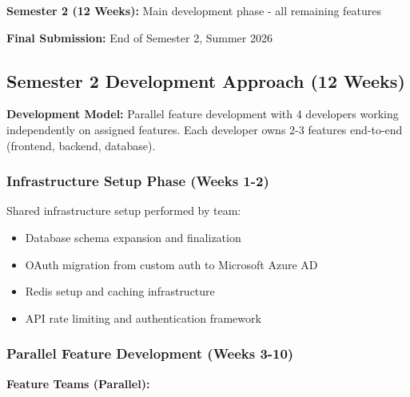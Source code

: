 \documentclass[12pt,a4paper]{article}
\begin{document}
\textbf{Semester 2 (12 Weeks):} Main development phase - all remaining features

\textbf{Final Submission:} End of Semester 2, Summer 2026

\subsection{Semester 2 Development Approach (12 Weeks)}

\textbf{Development Model:} Parallel feature development with 4 developers working independently on assigned features. Each developer owns 2-3 features end-to-end (frontend, backend, database).

\subsubsection{Infrastructure Setup Phase (Weeks 1-2)}
Shared infrastructure setup performed by team:
\begin{itemize}
    \item Database schema expansion and finalization
    \item OAuth migration from custom auth to Microsoft Azure AD
    \item Redis setup and caching infrastructure
    \item API rate limiting and authentication framework
\end{itemize}

\subsubsection{Parallel Feature Development (Weeks 3-10)}

\textbf{Feature Teams (Parallel):}
\end{document}

